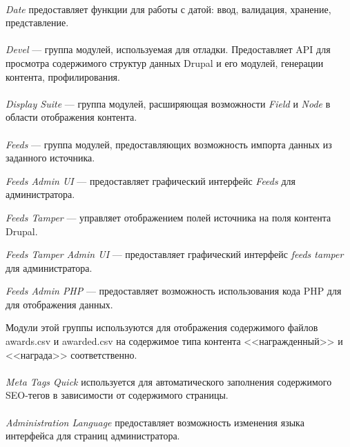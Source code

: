 \paragraph{}
\textit{Date} предоставляет функции для работы с датой:
ввод, валидация, хранение, представление.

\paragraph{}
\textit{Devel} --- группа модулей, используемая для отладки.
Предоставляет API для просмотра содержимого структур данных Drupal и его модулей,
генерации контента, профилирования.

\paragraph{}
\textit{Display Suite} --- группа модулей, расширяющая возможности
\textit{Field} и \textit{Node} в области отображения контента.

\paragraph{}
\textit{Feeds} --- группа модулей, предоставляющих возможность импорта данных 
из заданного источника.

\textit{Feeds Admin UI} --- предоставляет графический интерфейс \textit{Feeds} для администратора.

\textit{Feeds Tamper} --- управляет отображением полей источника на поля контента Drupal. 

\textit{Feeds Tamper Admin UI} --- предоставляет графический интерфейс
\textit{feeds tamper} для администратора.

\textit{Feeds Admin PHP} --- предоставляет возможность использования кода PHP для 
для отображения данных.

Модули этой группы используются для отображения содержимого файлов awards.csv и awarded.csv 
на содержимое типа контента <<награжденный>> и <<награда>> соответственно. 

\paragraph{}
\textit{Meta Tags Quick} используется для автоматического заполнения содержимого
SEO-тегов в зависимости от содержимого страницы.

\paragraph{}
\textit{Administration Language} предоставляет возможность изменения языка интерфейса для
страниц администратора.

